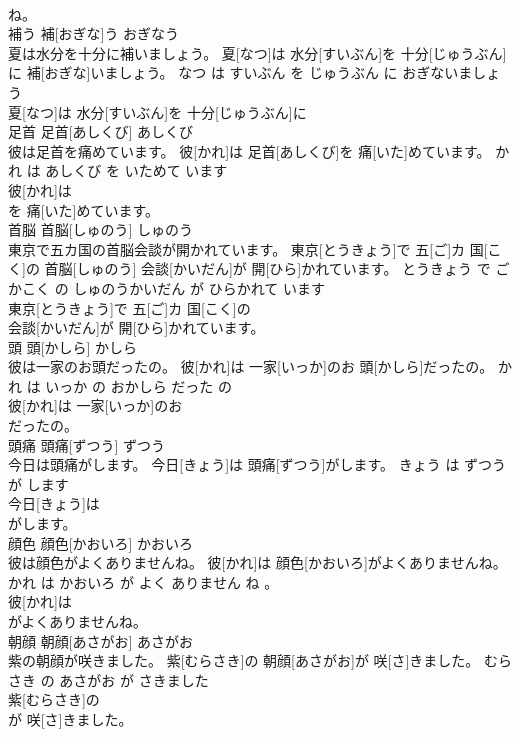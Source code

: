 \documentclass[8pt]{extreport}
\begin{document}
\begin{CJK}{UTF8}{min}
\\	ね。			
\\	補う	補[おぎな]う	おぎなう	
\\	夏は水分を十分に補いましょう。	夏[なつ]は 水分[すいぶん]を 十分[じゅうぶん]に 補[おぎな]いましょう。	なつ は すいぶん を じゅうぶん に おぎないましょう	
\\	夏[なつ]は 水分[すいぶん]を 十分[じゅうぶん]に
\\	足首	足首[あしくび]	あしくび	
\\	彼は足首を痛めています。	彼[かれ]は 足首[あしくび]を 痛[いた]めています。	かれ は あしくび を いためて います	
\\	彼[かれ]は
\\	を 痛[いた]めています。			
\\	首脳	首脳[しゅのう]	しゅのう	
\\	東京で五カ国の首脳会談が開かれています。	東京[とうきょう]で 五[ご]カ 国[こく]の 首脳[しゅのう] 会談[かいだん]が 開[ひら]かれています。	とうきょう で ごかこく の しゅのうかいだん が ひらかれて います	
\\	東京[とうきょう]で 五[ご]カ 国[こく]の
\\	会談[かいだん]が 開[ひら]かれています。			
\\	頭	頭[かしら]	かしら	
\\	彼は一家のお頭だったの。	彼[かれ]は 一家[いっか]のお 頭[かしら]だったの。	かれ は いっか の おかしら だった の	
\\	彼[かれ]は 一家[いっか]のお
\\	だったの。			
\\	頭痛	頭痛[ずつう]	ずつう	
\\	今日は頭痛がします。	今日[きょう]は 頭痛[ずつう]がします。	きょう は ずつう が します	
\\	今日[きょう]は
\\	がします。			
\\	顔色	顔色[かおいろ]	かおいろ	
\\	彼は顔色がよくありませんね。	彼[かれ]は 顔色[かおいろ]がよくありませんね。	かれ は かおいろ が よく ありません ね 。	
\\	彼[かれ]は
\\	がよくありませんね。			
\\	朝顔	朝顔[あさがお]	あさがお	
\\	紫の朝顔が咲きました。	紫[むらさき]の 朝顔[あさがお]が 咲[さ]きました。	むらさき の あさがお が さきました	
\\	紫[むらさき]の
\\	が 咲[さ]きました。			

\end{CJK}
\end{document}
